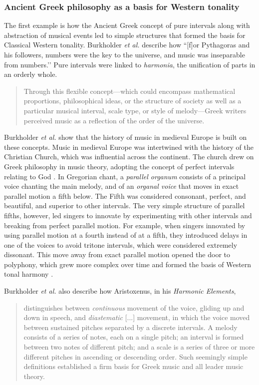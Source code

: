 \subsubsection{Ancient Greek philosophy as a basis for Western tonality}
The first example is how the Ancient Greek concept of pure intervals along with abstraction of musical events led to simple structures that formed the basis for Classical Western tonality. Burkholder \textit{et al.} describe how ``[f]or Pythagoras and his followers, numbers were the key to the universe, and music was inseparable from numbers.’’ Pure intervals were linked to \textit{harmonia}, the unification of parts in an orderly whole. \begin{quotation}Through this flexible concept---which could encompass mathematical proportions, philosophical ideas, or the structure of society as well as a particular musical interval, scale type, or style of melody---Greek writers perceived music as a reflection of the order of the universe. \cite[][Ch.~1, p.~13]{burkholder2010history}\end{quotation}

Burkholder \textit{et al.} show that the history of music in medieval Europe is built on these concepts. Music in medieval Europe was intertwined with the history of the Christian Church, which was influential across the continent. The church drew on Greek philosophy in music theory, adopting the concept of perfect intervals relating to God \cite[Ch.~2, p.~22]{burkholder2010history}. In Gregorian chant, a \textit{parallel organum} consists of a principal voice chanting the main melody, and of an \textit{organal voice} that moves in exact parallel motion a fifth below. The Fifth was considered consonant, perfect, and beautiful, and superior to other intervals. The very simple structure of parallel fifths, however, led singers to innovate by experimenting with other intervals and breaking from perfect parallel motion. For example, when singers innovated by using parallel motion at a fourth instead of at a fifth, they introduced delays in one of the voices to avoid tritone intervals, which were considered extremely dissonant. This move away from exact parallel motion opened the door to polyphony, which grew more complex over time and formed the basis of Western tonal harmony \cite[Ch.~5, p.~86]{burkholder2010history}.

Burkholder \textit{et al.} also describe how Aristoxenus, in his \textit{Harmonic Elements}, \begin{quotation}distinguishes between \textit{continuous} movement of the voice, gliding up and down in speech, and \textit{diastematic} [...] movement, in which the voice moved between sustained pitches separated by a discrete intervals. A melody consists of a series of notes, each on a single pitch; an interval is formed between two notes of different pitch; and a scale is a series of three or more different pitches in ascending or descending order. Such seemingly simple definitions established a firm basis for Greek music and all leader music theory. \cite[][Ch.~1, p.~15]{burkholder2010history}\end{quotation}

